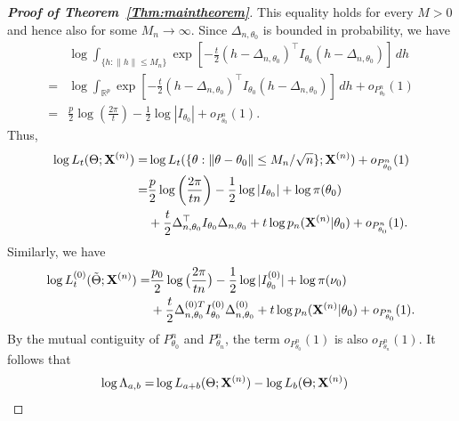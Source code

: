 \documentclass[11pt]{article}
\theoremstyle{plain}
\theoremstyle{definition}
\theoremstyle{remark}
\begin{document}
\begin{appendices}
\begin{proof}[\textbf{Proof of Theorem~\ref{Thm:maintheorem}}]
This equality holds for every $M>0$ and hence also for some $M_n\to \infty$.
Since $\Delta_{n,\theta_0}$ is bounded in probability, we have
        $$
            \begin{aligned}
            &\log \int_{\{h:\|h\|\leq M_n\}}\exp\left[ -\frac{t}{2}(h-\Delta_{n,\theta_0})^\top  I_{\theta_0}(h-\Delta_{n,\theta_0})\right] \, dh
                \\
                =&
                \log \int_{\mathbb{R}^p}\exp\left[ -\frac{t}{2}(h-\Delta_{n,\theta_0})^\top  I_{\theta_0}(h-\Delta_{n,\theta_0})\right] \, dh+o_{P^n_{\theta_0}}(1)
                \\
                =&
                \frac{p}{2}\log\left(\frac{2\pi}{t}\right)-\frac{1}{2}\log |I_{\theta_0}|
+o_{P^n_{\theta_0}}(1).
            \end{aligned}
        $$
        Thus,
$$
\begin{aligned}
    \log L_t(\Theta;\BX^{(n)})=&
    \log L_t(\{\theta:\|\theta-\theta_0\|\leq M_n/\sqrt{n}\};\BX^{(n)})+o_{P^n_{\theta_0}}(1)\\
    =
    &
        \frac{p}{2}\log\left(\frac{2\pi}{t n}\right)-\frac{1}{2}\log |I_{\theta_0}|
        +\log \pi(\theta_0)
        \\
     &+
    \frac{t}{2}\Delta_{n,\theta_0}^\top  I_{\theta_0}\Delta_{n,\theta_0}
    +
    t\log p_n(\BX^{(n)}|\theta_0)
    +o_{P^n_{\theta_0}}(1).
\end{aligned}
$$
Similarly, we have
\begin{equation*}
\begin{split}
    \log L_t^{(0)}(\tilde{\Theta};\mathbf{X}^{(n)}) 
    =&
    \frac{p_0}{2}\log\big(\frac{2\pi}{tn}\big)-\frac{1}{2}\log |I_{\theta_0}^{(0)}|
                +\log \pi(\nu_0)
                \\
             &+
             \frac{t}{2}\Delta_{n,\theta_0}^{{(0)}T} I^{(0)}_{\theta_0}\Delta^{(0)}_{n,\theta_0}
            +
            t\log p_n(\mathbf{X}^{(n)}|\theta_0)
            +o_{P^n_{\theta_0}}(1).
\end{split}
\end{equation*}
By the mutual contiguity of $P_{\theta_0}^n$ and $P^n_{\theta_n}$, the term $o_{P^n_{\theta_0}}(1)$ is also $o_{P^n_{\theta_n}}(1)$. 
It follows that
$$
\begin{aligned}
\log \Lambda_{a,b}
    =&
    \log L_{a+b}(\Theta;\BX^{(n)})-
    \log L_b(\Theta;\BX^{(n)})

\end{aligned}$$
\end{proof}
\end{appendices}
\end{document}
